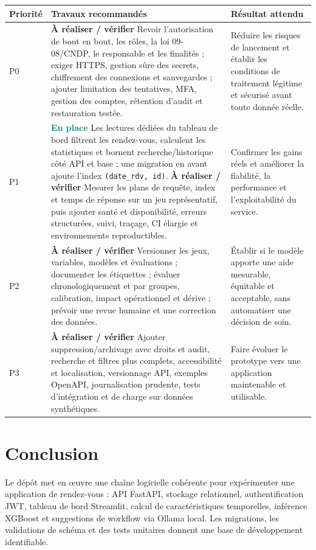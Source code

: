 \documentclass[11pt,a4paper]{report}
\newcommand{\code}[1]{\texttt{#1}}
\newcommand{\implemented}{\textcolor{teal}{\textbf{En place}}}
\newcommand{\planned}{\textcolor{amber}{\textbf{À réaliser / vérifier}}}
\begin{document}
\begin{longtable}{>{\raggedright\arraybackslash}p{1.5cm}
                  >{\raggedright\arraybackslash}p{5.5cm}
                  >{\raggedright\arraybackslash}p{6.8cm}}
\toprule
Priorité & Travaux recommandés & Résultat attendu\\
\midrule
\endhead
P0 & \planned{} Revoir l'autorisation de bout en bout, les rôles, la loi
09-08/CNDP, le responsable et les finalités ; exiger HTTPS, gestion sûre des
secrets, chiffrement des connexions et sauvegardes ; ajouter limitation des
tentatives, MFA, gestion des comptes, rétention d'audit et restauration
testée. & Réduire les risques de lancement et établir les conditions de
traitement légitime et sécurisé avant toute donnée réelle.\\
P1 & \implemented{} Les lectures dédiées du tableau de bord filtrent les
rendez-vous, calculent les statistiques et bornent recherche/historique côté
API et base ; une migration en avant ajoute l'index
\code{(date\_rdv, id)}. \planned{} Mesurer les plans de requête, index et
temps de réponse sur un jeu représentatif, puis ajouter santé et disponibilité,
erreurs structurées, suivi, traçage, CI élargie et environnements
reproductibles. & Confirmer les gains réels et améliorer la fiabilité,
la performance et l'exploitabilité du service.\\
P2 & \planned{} Versionner les jeux, variables, modèles et évaluations ;
documenter les étiquettes ; évaluer chronologiquement et par groupes,
calibration, impact opérationnel et dérive ; prévoir une revue humaine et
une correction des données. & Établir si le modèle apporte une aide mesurable,
équitable et acceptable, sans automatiser une décision de soin.\\
P3 & \planned{} Ajouter suppression/archivage avec droits et audit,
recherche et filtres plus complets, accessibilité et localisation, versionnage
API, exemples OpenAPI, journalisation prudente, tests d'intégration et de
charge sur données synthétiques. & Faire évoluer le prototype vers une
application maintenable et utilisable.\\
\bottomrule
\end{longtable}

\chapter{Conclusion}
Le dépôt met en œuvre une chaîne logicielle cohérente pour expérimenter une
application de rendez-vous : API FastAPI, stockage relationnel, authentification
JWT, tableau de bord Streamlit, calcul de caractéristiques temporelles,
inférence XGBoost et suggestions de workflow via Ollama local. Les migrations,
les validations de schéma et des tests unitaires donnent une base de
développement identifiable.
\end{document}
